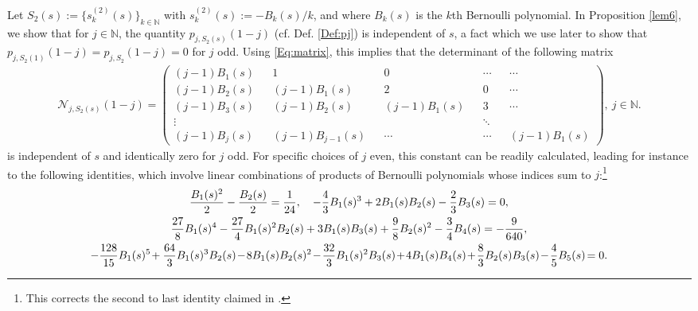 \documentclass[letterpaper,10pt]{amsart}
\newcommand{\N}{\mathbb N}
\numberwithin{equation}{section}
\begin{document}
Let $S_2(s):=\{s_{k}^{(2)}(s)\}_{k \in \N}$ with $s_{k}^{(2)}(s):=-B_k(s)/k$, and where $B_k(s)$ is the $k$th Bernoulli polynomial. In Proposition \ref{lem6}, we show that for $j \in \N$, the quantity $p_{j,S_2(s)}(1-j)$ (cf. Def. \ref{Def:pj}) is independent of $s$, a fact which we use later to show that $p_{j,S_2(1)}(1-j)=p_{j,S_2}(1-j)=0$ for $j$ odd. Using \eqref{Eq:matrix}, this implies that the determinant of the following matrix
\begin{align}\label{Eq:BerMatrix}
    \mathcal{N}_{j,S_2(s)}(1-j) = \begin{pmatrix}
        (j-1)B_1(s) && 1 && 0  && \cdots &&\cdots\\ (j-1)B_2(s) && (j-1)B_1(s) &&2&&0 &&\cdots \\ 
        (j-1)B_3(s) && (j-1)B_2(s)&& (j-1)B_1(s)&& 3 &&\cdots \\ \vdots && &&  && \ddots \\ (j-1)B_j(s) && (j-1)B_{j-1}(s) && \cdots &&  \cdots && (j-1)B_1(s)
    \end{pmatrix},\ j\in\mathbb{N}.
\end{align}
is independent of $s$ and identically zero for $j$ odd. For specific choices of $j$ even, this constant can be readily calculated, leading for instance to the following identities, which involve linear combinations of products of Bernoulli polynomials whose indices sum to $j$:\footnote{This corrects the second to last identity claimed in \cite[Sect. 5]{E13}.} 
\begin{gather}
    \frac{B_1(s)^2}{2}-\frac{B_2(s)}{2} = \frac{1}{24}, \quad  -\frac{4}{3}B_1(s)^3+2B_1(s)B_2(s)-\frac{2}{3}B_3(s)=0,\notag\\ \frac{27}{8}B_1(s)^4 -\frac{27}{4}B_1(s)^2B_2(s)+3B_1(s)B_3(s)+\frac{9}{8}B_2(s)^2-\frac{3}{4}B_4(s)=-\frac{9}{640}, \\ -\frac{128}{15}B_1(s)^5\hspace{-.05cm}+\frac{64}{3}B_1(s)^3B_2(s)\hspace{-.05cm}-\hspace{-.05cm}8B_1(s)B_2(s)^2\hspace{-.05cm}-\hspace{-.05cm}\frac{32}{3}B_1(s)^2B_3(s)\hspace{-.05cm}+\hspace{-.05cm}4B_1(s)B_4(s)\hspace{-.05cm}+\hspace{-.05cm}\frac{8}{3}B_2(s)B_3(s)\hspace{-.05cm}-\hspace{-.05cm}\frac{4}{5}B_5(s)\hspace{-.05cm}=0.\notag
\end{gather}
\end{document}
